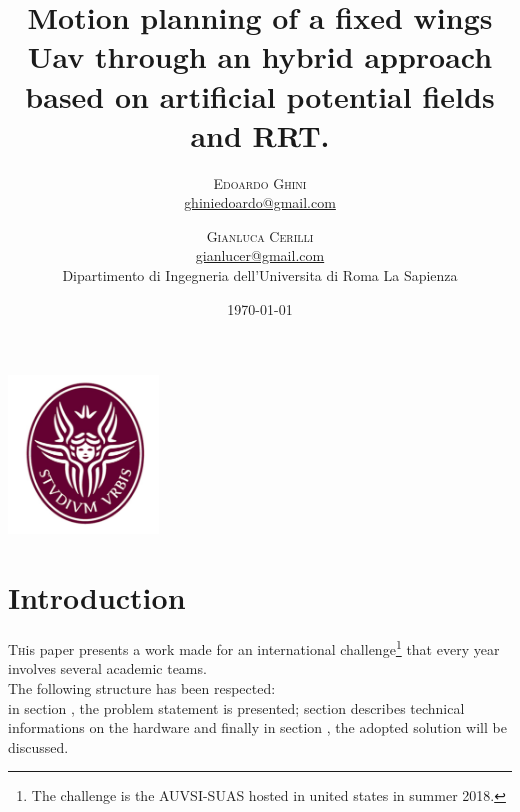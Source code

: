 \documentclass[oneside,onecolumn]{article}
\title{Motion planning of a fixed wings Uav through an hybrid approach based on artificial potential
  fields and RRT. } %
\author{%
  \textsc{Edoardo Ghini} \\[1ex] %
  \normalsize \href{mailto:ghiniedoardo@gmail.com}{ghiniedoardo@gmail.com} %
  \and %
  \textsc{Gianluca Cerilli} \\[1ex] %
  \normalsize \href{mailto:gianlucer@gmail.com}{gianlucer@gmail.com}\\ %
  \normalsize Dipartimento di Ingegneria dell'Universita di Roma La Sapienza\\
}
\date{\today} %
\begin{document}
\maketitle
\bigskip
\bigskip
\bigskip
\bigskip
\begin{center}
  \includegraphics[width=0.3\textwidth]{laSapienza}
\end{center}


\newpage
\section{Introduction}

\lettrine[nindent=0em,lines=3]{T}his paper presents a work made
for an international challenge\footnote{The challenge is the AUVSI-SUAS hosted in united states in summer 2018.} that every year involves several academic teams.\\
The following structure has been respected: \\
in section , the problem statement is presented; section  describes technical informations on the hardware and finally in section , the adopted solution will be discussed.

\end{document}
